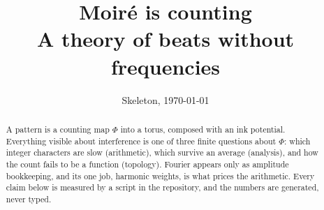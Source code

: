\documentclass[10pt]{article}
\title{Moir\'e is counting\\[0.3em]\large A theory of beats without frequencies}
\author{}
\date{Skeleton, \today}
\theoremstyle{plain}
\theoremstyle{definition}
\begin{document}
\maketitle

\begin{abstract}
A pattern is a counting map $\Phi$ into a torus, composed with an ink potential.
Everything visible about interference is one of three finite questions about
$\Phi$: which integer characters are slow (arithmetic), which survive an average
(analysis), and how the count fails to be a function (topology). Fourier appears
only as amplitude bookkeeping, and its one job, harmonic weights, is what prices
the arithmetic. Every claim below is measured by a script in the repository, and
the numbers are generated, never typed.
\end{abstract}










\end{document}
